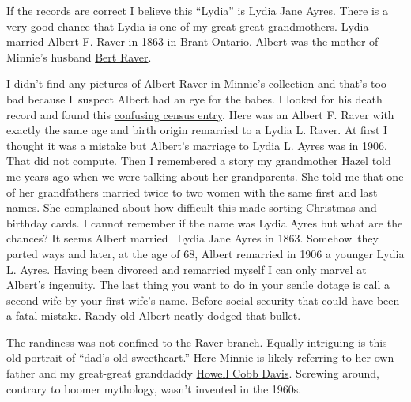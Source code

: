 If the records are correct I believe this ``Lydia'' is Lydia Jane Ayres.
There is a very good chance that Lydia is one of my great-great
grandmothers.
\href{https://familysearch.org/pal:/MM9.1.1/XLPB-DF8}{Lydia married
Albert F. Raver} in 1863 in Brant Ontario. Albert was the mother of
Minnie's husband
\href{https://familysearch.org/pal:/MM9.1.1/F3Q3-45X}{Bert Raver}.

I didn't find any pictures of Albert Raver in Minnie's collection and
that's too bad because I~suspect Albert had an eye for the babes. I
looked for his death record and found this
\href{https://familysearch.org/pal:/MM9.1.1/MVLY-WLB}{confusing census
entry}. Here was an Albert F. Raver with exactly the same age and birth
origin remarried to a Lydia L. Raver. At first I thought it was a
mistake but Albert's marriage to Lydia L. Ayres was in 1906. That did
not compute. Then I remembered a story my grandmother Hazel told me
years ago when we were talking about her grandparents. She told me that
one of her grandfathers married twice to two women with the same first
and last names. She complained about how difficult this made sorting
Christmas and birthday cards. I cannot remember if the name was Lydia
Ayres but what are the chances? It seems Albert married~ Lydia Jane
Ayres in 1863. Somehow~they parted ways and later, at the age of 68,
Albert remarried in 1906 a younger Lydia L. Ayres. Having been divorced
and remarried myself I can only marvel at Albert's ingenuity. The last
thing you want to do in your senile dotage is call a second wife by your
first wife's name. Before social security that could have been a fatal
mistake.
\href{http://www.findagrave.com/cgi-bin/fg.cgi?page=gr\&GRid=89404051}{Randy
old Albert} neatly dodged that bullet.

The randiness was not confined to the Raver branch. Equally intriguing
is this old portrait of ``dad's old sweetheart.'' Here Minnie is likely
referring to her own father and my great-great granddaddy
\href{http://www.findagrave.com/cgi-bin/fg.cgi?page=gr\&GSln=Davis\&GSfn=Howell\&GSmn=C\&GSby=1850\&GSbyrel=after\&GSdy=1950\&GSdyrel=before\&GSst=28\&GScntry=4\&GSob=n\&GRid=67837689\&df=all\&}{Howell
Cobb Davis}. Screwing around, contrary to boomer mythology, wasn't
invented in the 1960s.



